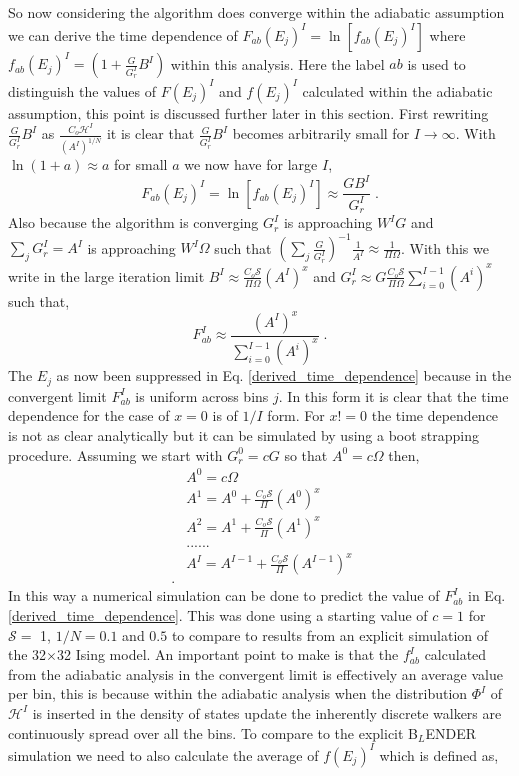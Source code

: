\documentclass[aps,pre,reprint,superscriptaddress,showkeys]{revtex4-2}
\begin{document}
   So now considering the algorithm does converge within the adiabatic assumption  we can derive the time dependence of $F_{ab}(E_j)^I=\ln[f_{ab}(E_j)^I]$ where $f_{ab}(E_j)^I = (1 + \frac{G}{G_r^I}B^I)$ within this analysis. Here the label $ab$ is used to distinguish the values of $F(E_j)^I$ and $f(E_j)^I$ calculated within the adiabatic assumption, this point is discussed further later in this section.  First rewriting $\frac{G}{G_r^I}B^I$ as $\frac{C_o\mathcal{H}^I}{(A^I)^{1/N}}$ it is clear that $\frac{G}{G_r^I}B^I$ becomes arbitrarily small for $I \rightarrow \infty$. With  $\ln(1+a) \approx a$ for small $a$ we now have for large $I$, 
\begin{equation}
F_{ab}(E_j)^I= \ln[f_{ab}(E_j)^I] \approx  \frac{GB^I}{G_r^I} \;.
\label{TD}
\end{equation}
  Also because the algorithm is converging $G_r^I$ is approaching $W^IG$ and $\sum_j G_r^I = A^I$ is approaching $W^I\Omega$ such that $(\sum_{j}\frac{G}{G_r^{I}})^{-1} \frac{1}{A^I}\approx \frac{1}{\Pi\Omega}$. With this we write  in the large iteration limit $B^I \approx  \frac{C_o\mathcal{S}}{\Pi\Omega}(A^I)^x$ and $G_r^I \approx G \frac{C_o\mathcal{S}}{\Pi\Omega}\sum_{i=0}^{I-1}(A^i)^x$ such that, 
\begin{equation}
F_{ab}^I \approx \frac{(A^I)^x}{\sum_{i=0}^{I-1}(A^i)^x} \;.
\label{derived_time_dependence}
\end{equation}
The $E_j$ as now been suppressed in Eq. \ref{derived_time_dependence} because in the convergent limit $F_{ab}^I$ is uniform across bins $j$.
In this form it is clear that the time dependence for the case of $x=0$ is of $1/I$ form. For $x != 0$ the time dependence is not as clear analytically but it can be simulated by using a boot strapping procedure. Assuming we start with $G_r^0=cG$ so that $A^0=c\Omega$ then, 
\begin{equation}
\begin{split}
&A^0=c\Omega\\
&A^1 = A^0     +  \frac{C_o\mathcal{S}}{\Pi}(A^0)^x\\
&A^2 = A^1     +  \frac{C_o\mathcal{S}}{\Pi}(A^1)^x\\
&......\\
&A^I = A^{I-1} +  \frac{C_o\mathcal{S}}{\Pi}(A^{I-1})^x\\\;.
\end{split}
\label{bootstrap}
\end{equation} 
In this way a numerical simulation can be done to predict the value of $F_{ab}^I$ in Eq. \ref{derived_time_dependence}. This was done using a starting value of $c=1$ for $\mathcal{S}=$ 1,  $1/N = 0.1$ and $0.5$ to compare to results from an explicit simulation of the 32$\times$32 Ising model. An important point to make is that the $f_{ab}^I$ calculated from the adiabatic analysis in the convergent limit is effectively an average value per bin, this is because within the adiabatic analysis when the distribution $\Phi^I$ of $\mathcal{H}^I$ is inserted in the density of states update the inherently discrete walkers are  continuously spread over all the bins.  To compare to the explicit B$_L$ENDER simulation we need to also calculate the average of $f(E_j)^I$ which is defined as,
\end{document}
